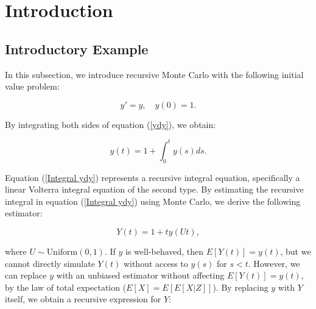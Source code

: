 \documentclass[a4paper,12pt]{article}
\begin{document}

\newpage
\tableofcontents
\newpage

\begin{abstract}
    
\end{abstract}


\section{Introduction}

\subsection{Introductory Example}
In this subsection, we introduce recursive Monte Carlo
with the following  initial value problem:

\begin{equation} \label{ydy}
    y' = y, \quad y(0) = 1.
\end{equation}

By integrating both sides of equation (\ref{ydy}), we obtain:

\begin{equation} \label{Integral ydy}
    y(t) = 1 + \int_{0}^{t} y(s) ds.
\end{equation}

Equation (\ref{Integral ydy}) represents a recursive integral equation,
specifically a linear Volterra integral equation of the second type.
By estimating the recursive integral in equation (\ref{Integral ydy})
using Monte Carlo, we derive the following estimator:

\begin{equation}
    Y(t) = 1 + t  y(Ut),
\end{equation}

where $U \sim \text{Uniform}(0,1)$.
If $y$ is well-behaved, then $E[Y(t)] = y(t)$,
but we cannot directly simulate $Y(t)$ without access
to $y(s)$ for $s < t$. However, we can replace $y$ with
an unbiased estimator without affecting $E[Y(t)] = y(t)$,
by the law of total expectation ($E[X] = E[E[X|Z]]$).
By replacing $y$ with $Y$ itself, we obtain a recursive
expression for $Y$:
\end{document}
